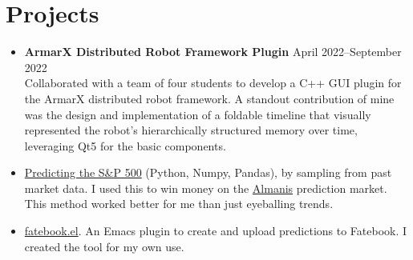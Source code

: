 \documentclass[letterpaper,10pt]{article}
\begin{document}
\section*{Projects}
\begin{itemize}
    \item \textbf{ArmarX Distributed Robot Framework Plugin} \hfill April 2022--September 2022 \\
          Collaborated with a team of four students to develop a C++ GUI plugin for the
          ArmarX distributed robot framework. A standout contribution of mine was the
          design and implementation of a foldable timeline that visually represented the
          robot's hierarchically structured memory over time, leveraging Qt5 for the basic components.
	\item \href{https://sonofhypnos.github.io/blog/prediction/python/2021/01/30/sp500.html}{Predicting the S\&P 500} (Python, Numpy, Pandas), by sampling from past market data. I used this to win money on the \href{https://www.almanisprivate.com/}{Almanis} prediction market. This method worked better for me than just eyeballing trends.
	\item \href{https://github.com/sonofhypnos/fatebook.el}{fatebook.el}. An Emacs plugin to create and upload predictions to Fatebook. I created the tool for my own use.
\end{itemize}
\end{document}
